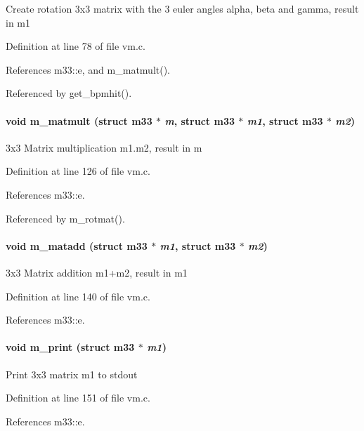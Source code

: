 Create rotation 3x3 matrix with the 3 euler angles alpha, beta and gamma, result in m1 

Definition at line 78 of file vm.c.

References m33::e, and m\_\-matmult().

Referenced by get\_\-bpmhit().
\paragraph[m\_\-matmult]{\setlength{\rightskip}{0pt plus 5cm}void m\_\-matmult (struct {\bf m33} $\ast$ {\em m}, \/  struct {\bf m33} $\ast$ {\em m1}, \/  struct {\bf m33} $\ast$ {\em m2})}\hfill\label{group__orbit_ga872e461b36c6760734cd7be2a21c305}


3x3 Matrix multiplication m1.m2, result in m 

Definition at line 126 of file vm.c.

References m33::e.

Referenced by m\_\-rotmat().
\paragraph[m\_\-matadd]{\setlength{\rightskip}{0pt plus 5cm}void m\_\-matadd (struct {\bf m33} $\ast$ {\em m1}, \/  struct {\bf m33} $\ast$ {\em m2})}\hfill\label{group__orbit_g1cee40ff55ef0d50e4178602a44d6a26}


3x3 Matrix addition m1+m2, result in m1 

Definition at line 140 of file vm.c.

References m33::e.
\paragraph[m\_\-print]{\setlength{\rightskip}{0pt plus 5cm}void m\_\-print (struct {\bf m33} $\ast$ {\em m1})}\hfill\label{group__orbit_g263940d9c1e4fe8e5873cca9fb6ea0cc}


Print 3x3 matrix m1 to stdout 

Definition at line 151 of file vm.c.

References m33::e.